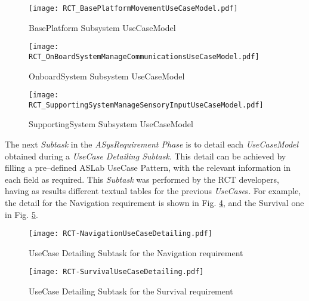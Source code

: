 \begin{itemize}
\begin{figure}[htbp]
\begin{center}
 {\texttt{[image: RCT\_BasePlatformMovementUseCaseModel.pdf]}}
\end{center}
\caption{BasePlatform Subsystem UseCaseModel}
\label{baseplatformusecasemodel}
\end{figure}

\begin{figure}[htbp]
\begin{center}
 {\texttt{[image: RCT\_OnBoardSystemManageCommunicationsUseCaseModel.pdf]}}
\end{center}
\caption{OnboardSystem Subsystem UseCaseModel}
\label{onboardusecasemodel}
\end{figure}

\begin{figure}[htbp]
\begin{center}
 {\texttt{[image: RCT\_SupportingSystemManageSensoryInputUseCaseModel.pdf]}}
\end{center}
\caption{SupportingSystem Subsystem UseCaseModel}
\label{supportingsystemusecasemodel}
\end{figure}

The next \emph{Subtask} in the \emph{ASysRequirement Phase} is to detail each \emph{UseCaseModel} obtained during a \emph{UseCase Detailing Subtask}. This detail can be achieved by filling a pre--defined ASLab UseCase Pattern, with the relevant information in each field as required. This \emph{Subtask} was performed by the RCT developers, having as results different textual tables for the previous \emph{UseCase}s. For example, the detail for the Navigation requirement is shown in Fig. \ref{RCTnavigationdetailing}, and the Survival one in Fig. \ref{RCTsurvivaldetailing}.\\

\begin{figure}[htbp]
\begin{center}
 {\texttt{[image: RCT-NavigationUseCaseDetailing.pdf]}}
\end{center}
\caption{UseCase Detailing Subtask for the Navigation requirement}
\label{RCTnavigationdetailing}
\end{figure}

\begin{figure}[htbp]
\begin{center}
 {\texttt{[image: RCT-SurvivalUseCaseDetailing.pdf]}}
\end{center}
\caption{UseCase Detailing Subtask for the Survival requirement}
\label{RCTsurvivaldetailing}
\end{figure}



\end{itemize}

